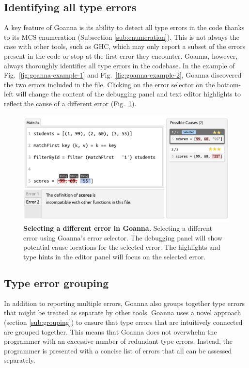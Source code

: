 \documentclass[pdflatex,sn-mathphys-num]{sn-jnl}%
\begin{document}
    \subsection{Identifying all type errors} \label{sub:all-errors}
    
    A key feature of Goanna is its ability to detect all type errors in the code thanks to its MCS enumeration (Subsection \ref{sub:enumeration}). This is not always the case with other tools, such as GHC, which may only report a subset of the errors present in the code or stop at the first error they encounter. Goanna, however, always thoroughly identifies all type errors in the codebase. In the example of Fig.~\ref{fig:goanna-example-1} and Fig.~\ref{fig:goanna-example-2}, Goanna discovered the two errors included in the file. Clicking on the error selector on the bottom-left will change the content of the debugging panel and text editor highlights to reflect the cause of a different error (Fig.~\ref{fig:multi-error}). 

    \begin{figure}[ht!]
        \centering
        \includegraphics[width=\linewidth]{images/goanna-multi-error}
        \caption[Selecting a different error in Goanna]{\textbf{Selecting a different error in Goanna.} Selecting a different error using Goanna's error selector. The debugging panel will show potential cause locations for the selected error. The highlights and type hints in the editor panel will focus on the selected error.}
        \label{fig:multi-error}
    \end{figure}



    \subsection{Type error grouping}  \label{sub:group}
    In addition to reporting multiple errors, Goanna also groups together type errors that might be treated as separate by other tools. Goanna uses a novel approach (section \ref{sub:grouping}) to ensure that type errors that are intuitively connected are grouped together. This means that Goanna does not overwhelm the programmer with an excessive number of redundant type errors. Instead, the programmer is presented with a concise list of errors that all can be assessed separately.
\end{document}
